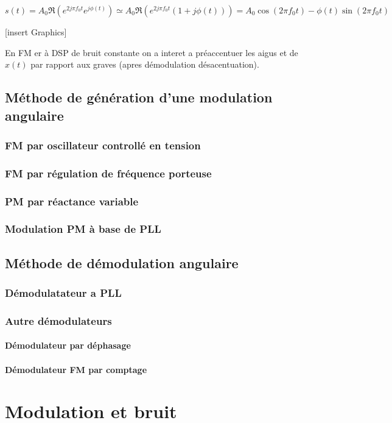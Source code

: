 \documentclass[main.tex]{subfiles}
\begin{document}
\[
s(t) = A_0 \Re(e^{2j\pi f_0t}e^{j\phi(t)}) \simeq  A_0 \Re(e^{2j\pi f_0t}(1+j\phi(t))) = A_0 \cos(2\pi f_0t) - \phi(t)\sin(2\pi f_0t)
\]

[insert Graphics]

En FM er à DSP de bruit constante on a interet a préaccentuer les aigus et de $x(t)$ par rapport aux graves (apres démodulation désacentuation).


\subsection{Méthode de génération d'une modulation angulaire}
\subsubsection{FM par oscillateur controllé en tension}
\subsubsection{FM par régulation de fréquence porteuse}
\subsubsection{PM par réactance variable}
\subsubsection{Modulation PM à base de PLL}
\subsection{Méthode de démodulation angulaire}
\subsubsection{Démodulatateur a PLL}
\subsubsection{Autre démodulateurs}
\paragraph{Démodulateur par déphasage}
\paragraph{Démodulateur FM par comptage}

\section{Modulation et bruit}
\end{document}
